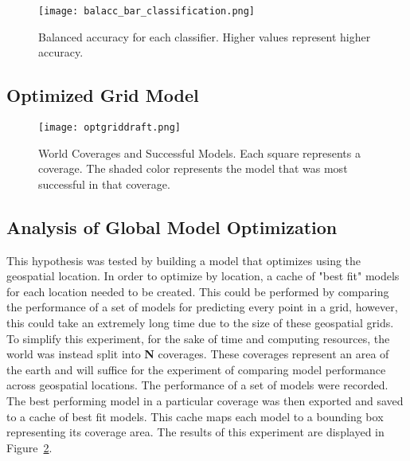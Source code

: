 \begin{figure}[htp]
    \centering
    \texttt{[image: balacc\_bar\_classification.png]}
    \caption{Balanced accuracy for each classifier. Higher values represent higher accuracy.}
    \label{fig:balacc_barplot_classification}
\end{figure}

\subsection{Optimized Grid Model}
\setlength{\parindent}{10ex}

\begin{figure}[htp]
    \centering
    \texttt{[image: optgriddraft.png]}
    \caption{World Coverages and Successful Models.
    Each square represents a coverage.
    The shaded color represents the model that was most successful in that coverage.}
    \label{fig:coveragegrid}
\end{figure}

\subsection{Analysis of Global Model Optimization}
This hypothesis was tested by building a model that optimizes using the geospatial location.
In order to optimize by location, a cache of "best fit" models for each location needed to be created.
This could be performed by comparing the performance of a set of models for predicting every point in a grid, however, this could take an extremely long time due to the size of these geospatial grids.
To simplify this experiment, for the sake of time and computing resources, the world was instead split into \textbf{N} coverages.
These coverages represent an area of the earth and will suffice for the experiment of comparing model performance across geospatial locations.
The performance of a set of models were recorded.
The best performing model in a particular coverage was then exported and saved to a cache of best fit models.
This cache maps each model to a bounding box representing its coverage area.
The results of this experiment are displayed in Figure~\ref{fig:coveragegrid}.

